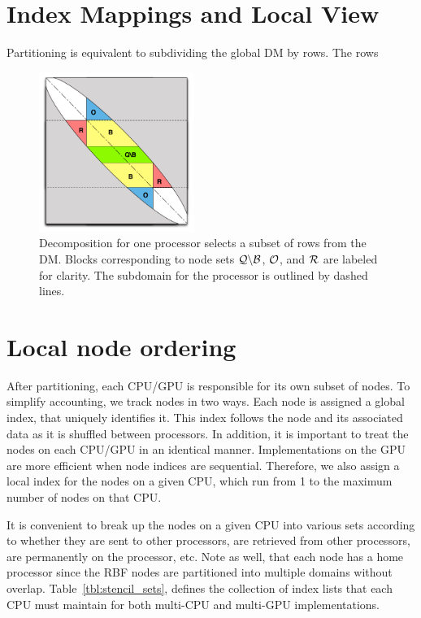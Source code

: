 \documentclass{report}
\begin{document}
\section{Index Mappings and Local View}

Partitioning is equivalent to subdividing the global DM by rows. 
The rows 

\begin{figure}
\begin{center}
\includegraphics[width=0.45\textwidth]{rbffd_methods_content/decompositions/MatrixDecompositionSets_RBF-FD_Bowed.pdf} 
\caption{Decomposition for one processor selects a subset of rows from the DM. Blocks corresponding to node sets $\mathcal{Q} \backslash \mathcal{B}$, $\mathcal{O}$, and $\mathcal{R}$ are labeled for clarity. The subdomain for the processor is outlined by dashed lines.}
\label{fig:decomp_matrix_view}
\end{center}
\end{figure}



\section{Local node ordering}

After partitioning, each CPU/GPU is responsible for its own subset of nodes. 
To simplify accounting, we track nodes in two ways. Each node is assigned
a global index, that uniquely identifies it. This index follows the node 
and its associated data as it is shuffled between processors. In addition, 
it is important to treat the nodes on each CPU/GPU in an identical manner. 
Implementations on the GPU are more efficient when node indices
are sequential. Therefore, we also assign a local index for the nodes on 
a given CPU, which run from 1 to the maximum number of nodes on that CPU. 

It is convenient to break up the nodes on a given CPU into various sets
according to whether they are sent to other processors, are retrieved from 
other processors, are permanently on the processor, etc. Note as well, 
that each node has a home processor since the RBF nodes are partitioned into 
multiple domains without overlap.
Table~\ref{tbl:stencil_sets}, defines the collection of index lists that each CPU must maintain for both multi-CPU and multi-GPU implementations.  
\end{document}
